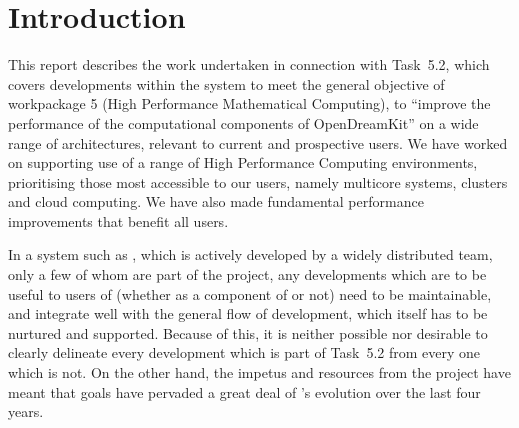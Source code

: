 \documentclass{deliverablereport}
\author{Author names}
\begin{document}
\maketitle
\githubissuedescription

\newpage
\tableofcontents






\section{Introduction}
This report describes the work undertaken in connection with Task~5.2,
which covers developments within the \GAP system to meet the general
objective of workpackage 5 (High Performance Mathematical
Computing), to ``improve the performance of the computational
components of OpenDreamKit'' on  a wide range of architectures,
relevant to current and prospective users. We have worked on
supporting use of a range of High Performance Computing environments,
prioritising those most accessible to our users, namely multicore
systems, clusters and cloud computing. We have also made
fundamental performance improvements that benefit all \GAP users.

In a system such as \GAP, which is actively developed by a widely
distributed team, only a few of whom are part of the \ODK project, any
developments which are to be useful to users of \GAP (whether as a component of
\ODK or not) need to be maintainable, and
integrate well with the general flow of \GAP development, which itself
has to be nurtured and supported. Because of this, it is neither
possible nor desirable to clearly delineate every development which
is part of Task~5.2 from every one which is not. On the other hand,
the impetus and resources from the \ODK project have meant that \ODK
goals have pervaded a great deal of \GAP's evolution over the last
four years.
\end{document}
